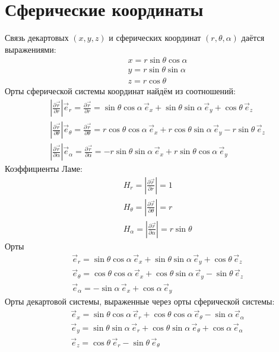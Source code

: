 \section{Сферические координаты}

Связь декартовых $(x, y, z)$ и сферических координат $(r, \theta, \alpha)$ даётся выражениями:
\[
	\begin{aligned}
		& x = r \sin \theta \cos \alpha \\
		& y = r \sin \theta \sin \alpha \\
		& z = r \cos \theta 
	\end{aligned}
\]
Орты сферической системы координат найдём из соотношений:
\[
	\begin{aligned}
	& \left|\frac{\partial \vec{r}}{\partial r}\right| \vec{e}_r = \frac{\partial \vec{r}}{\partial r} =  \sin \theta \cos \alpha\, \vec{e}_x + \sin \theta \sin \alpha\, \vec{e}_y + \cos \theta\, \vec{e}_z \\
	& \left|\frac{\partial \vec{r}}{\partial \theta}\right| \vec{e}_\theta = \frac{\partial \vec{r}}{\partial \theta} =  r \cos \theta \cos \alpha\, \vec{e}_x + r \cos \theta \sin \alpha\, \vec{e}_y - r \sin \theta\, \vec{e}_z \\
	& \left|\frac{\partial \vec{r}}{\partial \alpha}\right| \vec{e}_\alpha = \frac{\partial \vec{r}}{\partial \alpha} = - r \sin \theta \sin \alpha\, \vec{e}_x + r \sin \theta \cos \alpha\, \vec{e}_y
	\end{aligned}
\]
Коэффициенты Ламе:
\[
	\begin{aligned}
		& H_r =  \left|\frac{\partial \vec{r}}{\partial r}\right| = 1 \\
		& H_\theta = \left|\frac{\partial \vec{r}}{\partial \theta}\right| = r \\
		& H_\alpha = \left|\frac{\partial \vec{r}}{\partial \alpha}\right| = r \sin \theta
	\end{aligned}
\]
Орты
\[
	\begin{aligned}
	& \vec{e}_r = \sin \theta \cos \alpha\, \vec{e}_x + \sin \theta \sin \alpha\, \vec{e}_y + \cos \theta\, \vec{e}_z \\
	& \vec{e}_\theta = \cos \theta \cos \alpha\, \vec{e}_x + \cos \theta \sin \alpha\, \vec{e}_y - \sin \theta\, \vec{e}_z \\
	& \vec{e}_\alpha = -\sin \alpha\, \vec{e}_x + \cos \alpha\, \vec{e}_y
	\end{aligned}
\]
Орты декартовой системы, выраженные через орты сферической системы:
\[
	\begin{aligned}
	& \vec{e}_x = \sin \theta \cos \alpha\, \vec{e}_r + \cos \theta \cos \alpha\, \vec{e}_\theta -\sin \alpha\,  \vec{e}_\alpha \\
	& \vec{e}_y = \sin \theta \sin \alpha\, \vec{e}_r + \cos \theta \sin \alpha\, \vec{e}_\theta + \cos \alpha\, \vec{e}_\alpha \\
	& \vec{e}_z = \cos \theta\,\vec{e}_r - \sin \theta\, \vec{e}_\theta
	\end{aligned}
\]
